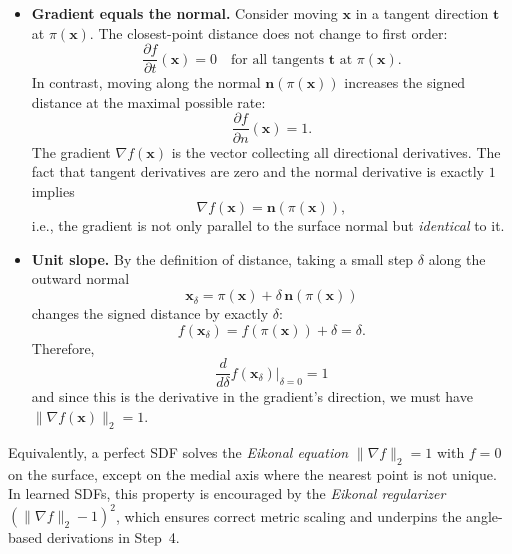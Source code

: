 \begin{enrichment}
\begin{enrichment}
        \begin{itemize}
            \item \textbf{Gradient equals the normal.}  
            Consider moving $\mathbf{x}$ in a tangent direction $\mathbf{t}$ at $\pi(\mathbf{x})$.  
            The closest-point distance does not change to first order:
            \[
            \frac{\partial f}{\partial t}(\mathbf{x}) = 0 \quad \text{for all tangents $\mathbf{t}$ at $\pi(\mathbf{x})$}.
            \]
            In contrast, moving along the normal $\mathbf{n}(\pi(\mathbf{x}))$ increases the signed distance at the maximal possible rate:
            \[
            \frac{\partial f}{\partial n}(\mathbf{x}) = 1.
            \]
            The gradient $\nabla f(\mathbf{x})$ is the vector collecting all directional derivatives.  
            The fact that tangent derivatives are zero and the normal derivative is exactly $1$ implies
            \[
            \nabla f(\mathbf{x}) = \mathbf{n}(\pi(\mathbf{x})),
            \]
            i.e., the gradient is not only parallel to the surface normal but \emph{identical} to it.
            
            \item \textbf{Unit slope.}  
            By the definition of distance, taking a small step $\delta$ along the outward normal
            \[
            \mathbf{x}_\delta = \pi(\mathbf{x}) + \delta\,\mathbf{n}(\pi(\mathbf{x}))
            \]
            changes the signed distance by exactly $\delta$:
            \[
            f(\mathbf{x}_\delta) = f(\pi(\mathbf{x})) + \delta = \delta.
            \]
            Therefore,
            \[
            \frac{d}{d\delta} f(\mathbf{x}_\delta)\Big|_{\delta=0} = 1
            \]
            and since this is the derivative in the gradient’s direction, we must have $\|\nabla f(\mathbf{x})\|_2 = 1$.
        \end{itemize}
        
        Equivalently, a perfect SDF solves the \emph{Eikonal equation} $\|\nabla f\|_2 = 1$ with $f = 0$ on the surface, except on the medial axis where the nearest point is not unique.  
        In learned SDFs, this property is encouraged by the \emph{Eikonal regularizer} $(\|\nabla f\|_2 - 1)^2$, which ensures correct metric scaling and underpins the angle-based derivations in Step~4.
        

\end{enrichment}
\end{enrichment}
